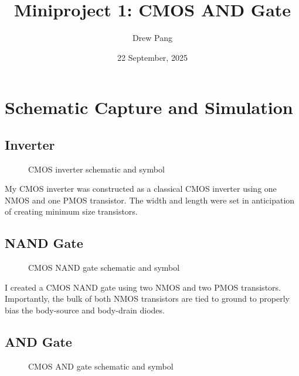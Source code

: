 \documentclass[11pt]{article}
\title{Miniproject 1: CMOS AND Gate}
\author{Drew Pang }
\date{22 September, 2025}
\begin{document}
\maketitle

\section*{Schematic Capture and Simulation}

\subsection*{Inverter}

\begin{figure}[H]
  \centering
  
  
  \caption{CMOS inverter schematic and symbol}
\end{figure}

My CMOS inverter was constructed as a classical CMOS inverter using one NMOS and one PMOS transistor. The width and length were set in anticipation of creating minimum size transistors.

\subsection*{NAND Gate}

\begin{figure}[H]
  \centering
  
  
  \caption{CMOS NAND gate schematic and symbol}
\end{figure}

I created a CMOS NAND gate using two NMOS and two PMOS transistors. Importantly, the bulk of both NMOS transistors are tied to ground to properly bias the body-source and body-drain diodes.

\subsection*{AND Gate}

\begin{figure}[H]
  \centering
  
  
  \caption{CMOS AND gate schematic and symbol}
\end{figure}
\end{document}
